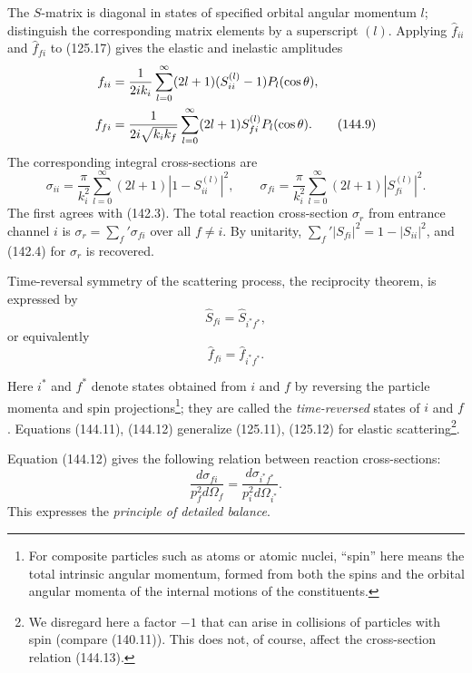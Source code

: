 The $S$-matrix is diagonal in states of specified orbital angular momentum
$l$; distinguish the corresponding matrix elements by a superscript $(l)$.
Applying $\widehat f_{ii}$ and $\widehat f_{fi}$ to (125.17) gives the elastic
and inelastic amplitudes
\begin{align}
 f_{ii}&=\frac1{2ik_i}\sum_{l=0}^{\infty}(2l+1)(S_{ii}^{(l)}-1)P_l(\cos\theta),\notag\\
 f_{fi}&=\frac1{2i\sqrt{k_ik_f}}\sum_{l=0}^{\infty}(2l+1)S_{fi}^{(l)}P_l(\cos\theta).
 \tag{144.9}
\end{align}
The corresponding integral cross-sections are
\begin{equation}
 \sigma_{ii}=\frac\pi{k_i^2}\sum_{l=0}^{\infty}(2l+1)|1-S_{ii}^{(l)}|^2,
 \qquad
 \sigma_{fi}=\frac\pi{k_i^2}\sum_{l=0}^{\infty}(2l+1)|S_{fi}^{(l)}|^2.
 \tag{144.10}
\end{equation}
The first agrees with (142.3). The total reaction cross-section $\sigma_r$
from entrance channel $i$ is $\sigma_r=\sum_f'\sigma_{fi}$ over all
$f\ne i$. By unitarity, $\sum_f'|S_{fi}|^2=1-|S_{ii}|^2$, and (142.4) for
$\sigma_r$ is recovered.

Time-reversal symmetry of the scattering process, the reciprocity theorem, is
expressed by
\begin{equation}
 \widehat S_{fi}=\widehat S_{i^*f^*},
 \tag{144.11}
\end{equation}
or equivalently
\begin{equation}
 \widehat f_{fi}=\widehat f_{i^*f^*}.
 \tag{144.12}
\end{equation}

Here $i^*$ and $f^*$ denote states obtained from $i$ and $f$ by reversing the
particle momenta and spin projections\footnote{For composite particles such
as atoms or atomic nuclei, ``spin'' here means the total intrinsic angular
momentum, formed from both the spins and the orbital angular momenta of the
internal motions of the constituents.}; they are called the
\emph{time-reversed} states of $i$ and $f$. Equations (144.11), (144.12)
generalize (125.11), (125.12) for elastic scattering\footnote{We disregard
here a factor $-1$ that can arise in collisions of particles with spin
(compare (140.11)). This does not, of course, affect the cross-section
relation (144.13).}.

Equation (144.12) gives the following relation between reaction
cross-sections:
\begin{equation}
 \frac{d\sigma_{fi}}{p_f^2d\Omega_f}
 =\frac{d\sigma_{i^*f^*}}{p_i^2d\Omega_{i^*}}.
 \tag{144.13}
\end{equation}
This expresses the \emph{principle of detailed balance}.

